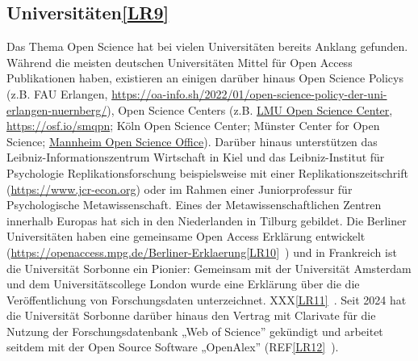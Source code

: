 \documentclass[
  letterpaper,
  DIV=11,
  numbers=noendperiod]{scrreprt}
\begin{document}
\subsection{\texorpdfstring{Universitäten\hyperref[_msocom_9]{{[}LR9{]}}~}{Universitäten{[}LR9{]}~}}\label{universituxe4tenlr9}

Das Thema Open Science hat bei vielen Universitäten bereits Anklang
gefunden. Während die meisten deutschen Universitäten Mittel für Open
Access Publikationen haben, existieren an einigen darüber hinaus Open
Science Policys (z.B. FAU Erlangen,
\url{https://oa-info.sh/2022/01/open-science-policy-der-uni-erlangen-nuernberg/}),
Open Science Centers (z.B.
\href{https://www.osc.uni-muenchen.de/index.html}{LMU Open Science
Center}, \url{https://osf.io/smqpn}; Köln Open Science Center; Münster
Center for Open Science;
\href{https://www.uni-mannheim.de/open-science/open-science-office/}{Mannheim
Open Science Office}). Darüber hinaus unterstützen das
Leibniz-Informationszentrum Wirtschaft in Kiel und das Leibniz-Institut
für Psychologie Replikationsforschung beispielsweise mit einer
Replikationszeitschrift (\url{https://www.jcr-econ.org}) oder im Rahmen
einer Juniorprofessur für Psychologische Metawissenschaft. Eines der
Metawissenschaftlichen Zentren innerhalb Europas hat sich in den
Niederlanden in Tilburg gebildet. Die Berliner Universitäten haben eine
gemeinsame Open Access Erklärung entwickelt
(\url{https://openaccess.mpg.de/Berliner-Erklaerung}\hyperref[_msocom_10]{{[}LR10{]}}~)
und in Frankreich ist die Universität Sorbonne ein Pionier: Gemeinsam
mit der Universität Amsterdam und dem Universitätscollege London wurde
eine Erklärung über die die Veröffentlichung von Forschungsdaten
unterzeichnet. XXX\hyperref[_msocom_11]{{[}LR11{]}}~. Seit 2024 hat die
Universität Sorbonne darüber hinaus den Vertrag mit Clarivate für die
Nutzung der Forschungsdatenbank „Web of Science'' gekündigt und arbeitet
seitdem mit der Open Source Software „OpenAlex''
(REF\hyperref[_msocom_12]{{[}LR12{]}}~).
\end{document}
